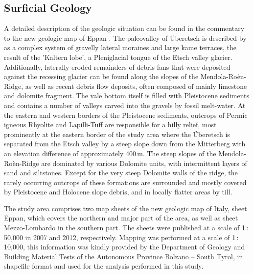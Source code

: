 \documentclass[preprint,12pt,authoryear]{elsarticle}
\begin{document}
\subsection{Surficial Geology}
A detailed  description of the geologic situation can be found in the commentary to the new geologic map of Eppan \citep{Avanzini2006}. 
The paleovalley of {\"U}beretsch is described by \cite{Scholz2005} as a complex system of gravelly lateral moraines and large kame terraces, the result of the 'Kaltern lobe', a Pleniglacial tongue of the Etsch valley glacier. Additionally, laterally eroded remainders of debris fans that were deposited against the recessing glacier can be found along the slopes of the Mendola-Ro\`en-Ridge, as well as recent debris flow deposits, often composed of mainly limestone and dolomite fragment. The vale bottom itself is filled with Pleistocene sediments and contains a  number of valleys carved into the gravels by fossil melt-water. At the eastern and western borders of the Pleistocene sediments, outcrops of Permic igneous Rhyolite and Lapilli-Tuff are responsible for a hilly relief, most prominently at the eastern border of the study area where the {\"U}beretsch is separated from the Etsch valley by a steep slope down from the Mitterberg with an elevation difference of approximately 400\,m.   
The steep slopes of the Mendola-Ro\`en-Ridge are dominated by various Dolomite units, with intermittent layers of sand and siltstones. Except for the very steep Dolomite walls of the ridge, the rarely occurring outcrops of these formations are surrounded and mostly covered by Pleistocene and Holocene slope debris, and in locally flatter areas by till. 
 
The study area comprises two map sheets of the new geologic map of Italy, sheet Eppan,  which covers the northern and major part of the area, as well as sheet Mezzo-Lombardo in the southern part. The sheets were published at a scale of 1\,:\,50,000 in 2007 and 2012, respectively. Mapping was performed at a scale of 1\,:\,10,000, this information was kindly provided by the Department of Geology and Building Material Tests of the Autonomous Province Bolzano -- South Tyrol, in shapefile format and used for the analysis performed in this study.
 
\end{document}
